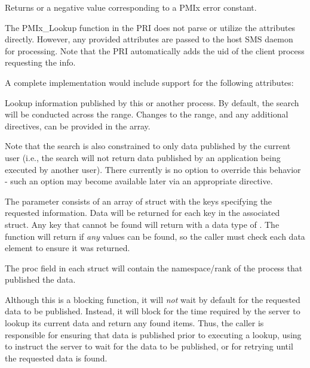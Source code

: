 \begin{arglist}
\end{arglist}

Returns  or a negative value corresponding to a PMIx error constant.

\priattr
The PMIx_Lookup function in the \ac{PRI} does not parse or utilize the attributes directly. However, any provided attributes are passed to the host \ac{SMS} daemon for processing. Note that the \ac{PRI} automatically adds the uid of the client process requesting the info.

\optattr
A complete implementation would include support for the following attributes:


\descr

Lookup information published by this or another process.
By default, the search will be conducted across the  range.
Changes to the range, and any additional directives, can be provided in the  array.

Note that the search is also constrained to only data published by the current user (i.e., the search will not return data published by an application being executed by another user).
There currently is no option to override this behavior - such an option may become available later via an appropriate  directive.

The  parameter consists of an array of  struct with the keys specifying the requested information.
Data will be returned for each key in the associated  struct.
Any key that cannot be found will return with a data type of .
The function will return  if \emph{any} values can be found, so the caller must check each data element to ensure it was returned.

The proc field in each  struct will contain the namespace/rank of the process that published the data.

\adviceuserstart
Although this is a blocking function, it will \emph{not} wait by default for the requested data to be published.
Instead, it will block for the time required by the server to lookup its current data and return any found items.
Thus, the caller is responsible for ensuring that data is published prior to executing a lookup, using  to instruct the server to wait for the data to be published, or for retrying until the requested data is found.
\adviceuserend

